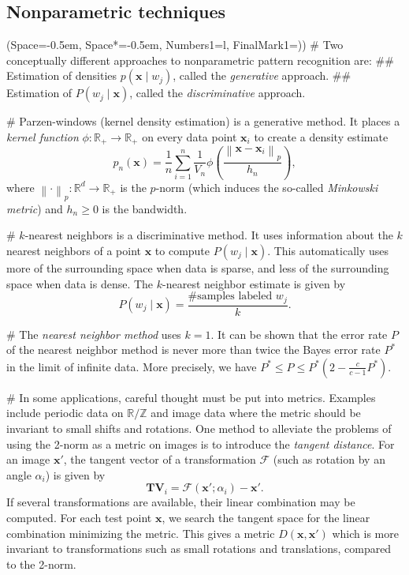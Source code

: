 \documentclass[12pt, a4paper]{article}
\newcommand{\listSpace}{-0.5em}%
\newcommand{\R}{\mathbb{R}}
\newcommand{\F}{\mathcal{F}}
\newcommand{\Z}{\mathbb{Z}}
\newcommand{\vect}[1]{\bm{#1}}
\newcommand{\norm}[1]{\left\lVert#1\right\rVert}
\begin{document}
\subsection{Nonparametric techniques}
\begin{easylist}[itemize]
\ListProperties(Space=\listSpace, Space*=\listSpace, Numbers1=l, FinalMark1={)})
# Two conceptually different approaches to nonparametric pattern recognition are: 
## Estimation of densities $p(\vect{x} \mid w_j)$, called the \emph{generative} approach.
## Estimation of $P(w_j \mid \vect{x})$, called the \emph{discriminative} approach.

# Parzen-windows (kernel density estimation) is a generative method. 
It places a \emph{kernel function} $\phi: \R_+ \to \R_+$ on every data point $\vect{x}_i$ to create a density estimate
\begin{equation*}
	p_n(\vect{x}) = \frac{1}{n} \sum_{i=1}^{n} \frac{1}{V_n} 
	\phi \left( \frac{\norm{\vect{x} - \vect{x}_i}_p}{h_n}  \right),
\end{equation*}
where $\norm{\cdot}_p: \R^d \to \R_+$ is the $p$-norm (which induces the so-called \emph{Minkowski metric}) and $h_n \geq 0$ is the bandwidth.

# $k$-nearest neighbors is a discriminative method.
It uses information about the $k$ nearest neighbors of a point $\vect{x}$ to compute $P(w_j \mid \vect{x})$.
This automatically uses more of the surrounding space when data is sparse, and less of the surrounding space when data is dense.
The $k$-nearest neighbor estimate is given by
\begin{equation*}
	P(w_j \mid \vect{x}) = \frac{\text{\# samples labeled } w_j}{k}.
\end{equation*}

# The \emph{nearest neighbor method} uses $k= 1$.
It can be shown that the error rate $P$ of the nearest neighbor method is never more than twice the Bayes error rate $P^*$ in the limit of infinite data.
More precisely, we have $P^* \leq P \leq P^* (2 - \frac{c}{c-1} P^*)$.

# In some applications, careful thought must be put into metrics.
Examples include periodic data on $\R / \Z$ and image data where the metric should be invariant to small shifts and rotations.
One method to alleviate the problems of using the 2-norm as a metric on images is to introduce the \emph{tangent distance}.
For an image $\vect{x}'$, the tangent vector of a transformation $\F$ (such as rotation by an angle $\alpha_i$) is given by
\begin{equation*}
	\vect{TV}_i = \F\left(\vect{x}'; \alpha_i \right) - \vect{x}'.
\end{equation*}
If several transformations are available, their linear combination may be computed.
For each test point $\vect{x}$, we search the tangent space for the linear  combination minimizing the metric.
This gives a metric $D(\vect{x}, \vect{x}')$ which is more invariant to transformations such as small rotations and translations, compared to the 2-norm.


\end{easylist}
\end{document}
